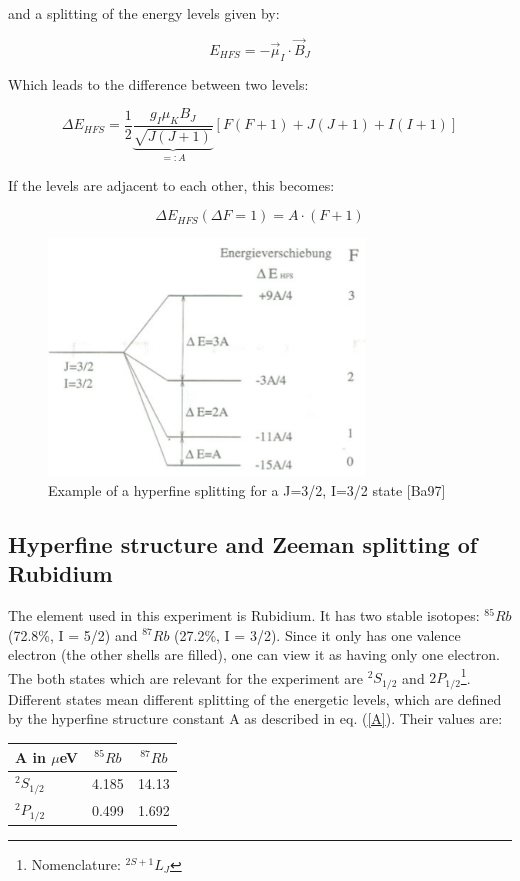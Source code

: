 and a splitting of the energy levels given by:

$$E_{HFS} = -\vec\mu_I\cdot\vec B_J$$

Which leads to the difference between two levels:

$$\Delta E_{HFS} = \frac{1}{2}\underbrace{\frac{g_I\mu_KB_J}{\sqrt{J(J+1)}}}_{=:A}[F(F+1) + J(J+1) + I(I+1)]$$

If the levels are adjacent to each other, this becomes:

\begin{equation} \Delta E_{HFS}(\Delta F = 1) = A\cdot (F+1) \label{A} \end{equation} 


\begin{figure}[H]
\centering \includegraphics[width=0.75\textwidth]{BilderTheo/HFAufspaltung.png}
\caption{Example of a hyperfine splitting for a J=3/2, I=3/2 state [Ba97]}
\end{figure}


\subsection{Hyperfine structure and Zeeman splitting of Rubidium}

The element used in this experiment is Rubidium. It has two stable isotopes:  $^{85}Rb$ (72.8\%, I = 5/2) and $^{87}Rb$ (27.2\%, I = 3/2). Since it only has one valence electron (the other shells are filled), one can view it as having only one electron. The both states which are relevant for the experiment are $^2S_{1/2}$ and $2P_{1/2}$\footnote{Nomenclature: $^{2S+1}L_J$}. Different states mean different splitting of the energetic levels, which are defined by the hyperfine structure constant A as described in eq. (\ref{A}). Their values are:

\begin{center}
\begin{tabular}[H]{| l | c c |} \hline
A in $\mu$eV & $^{85}Rb$ & $^{87}Rb$ \\ \hline
$^2S_{1/2}$ & 4.185 & 14.13  \\
$^2P_{1/2}$ & 0.499 & 1.692 \\ \hline
\end{tabular}
\end{center}

